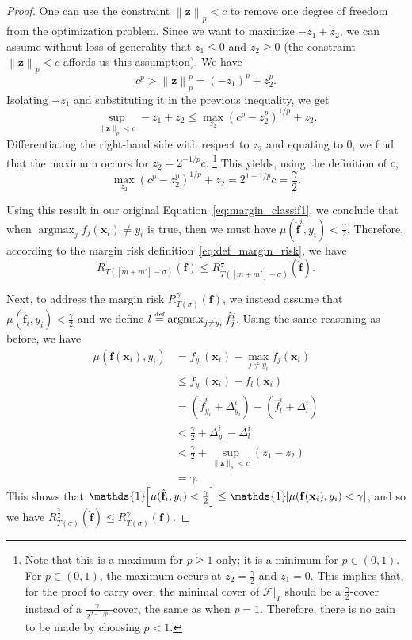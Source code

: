 \documentclass[twoside,11pt]{article}
\newcommand{\Id}[1]{\mathds{1}\hspace{-2.5pt}\left[#1\right]}
\newcommand{\norm}[1]{\left\lVert#1\right\rVert}
\newcommand{\F}{\mathcal{F}}
\newcommand{\f}{\mathbf{f}}
\newcommand{\x}{\mathbf{x}}
\newcommand{\fhat}{\hat{\f}}
\newcommand{\z}{\mathbf{z}}
\newcommand{\gammacover}{\frac{\gamma}{2^{2-1/p}}}
\newcommand{\eqdef}{\overset{\smash{\mbox{\tiny \rm def}}}{=}}
\DeclareMathOperator*{\argmax}{argmax}
\begin{document}
\begin{proof}
One can use the constraint $\norm{\z}_p < c$ to remove one degree of freedom from the optimization problem.
Since we want to maximize $-z_1 + z_2$, we can assume without loss of generality that $z_1 \le 0$ and $z_2 \ge 0$ (the constraint $\norm{\z}_p < c$ affords us this assumption).
We have
\begin{equation*}
    c^p > \norm{\z}_p^p = (-z_1)^p + z_2^p.
\end{equation*}
Isolating $-z_1$ and substituting it in the previous inequality, we get
\begin{equation*}
    \sup_{\lVert\z\rVert_p < c} -z_1 + z_2 \le \max_{z_2} (c^p-z_2^p)^{1/p} + z_2.
\end{equation*}
Differentiating the right-hand side with respect to $z_2$ and equating to $0$, we find that the maximum occurs for $z_2 = 2^{-1/p} c$.
\footnote{Note that this is a maximum for $p \ge 1$ only; it is a minimum for $p \in (0,1)$.
For $p \in (0,1)$, the maximum occurs at $z_2=\frac{\gamma}{2}$ and $z_1=0$.
This implies that, for the proof to carry over, the minimal cover of $\F|_T$ should be a $\frac{\gamma}{2}$-cover instead of a $\gammacover$-cover, the same as when $p=1$.
Therefore, there is no gain to be made by choosing $p<1$.}
This yields, using the definition of $c$,
\begin{equation*}
\max_{z_2} (c^p-z_2^p)^{1/p} + z_2 = 2^{1 - 1/p} c = \frac{\gamma}{2}.
\end{equation*}

Using this result in our original Equation~\eqref{eq:margin_classif1}, we conclude that when $\argmax_j f_j(\x_i) \neq y_i$ is true, then we must have $\mu(\fhat^i,y_i) < \frac{\gamma}{2}$.
Therefore, according to the margin risk definition~\eqref{eq:def_margin_risk}, we have
\begin{equation*}
    R_{T([m+m']-\sigma)}(\f) \le R^{\frac{\gamma}{2}}_{T([m+m']-\sigma)}(\fhat).
\end{equation*}

Next, to address the margin risk $R^\gamma_{T(\sigma)}(\f)$, we instead assume that $\mu(\fhat_i, y_i) < \frac{\gamma}{2}$ and we define $l \eqdef \argmax_{j \ne y_i} \hat{f}_j^i$.
Using the same reasoning as before, we have
\begin{align*}
    \mu(\f(\x_i), y_i)
    &= f_{y_i}(\x_i) - \max_{j\ne y_i} f_j(\x_i)\\
    &\le f_{y_i}(\x_i) - f_l(\x_i)\\
    &= (\hat{f}_{y_i}^i + \Delta_{y_i}^i) - (\hat{f}_{l}^i + \Delta_{l}^i)\\
    &< \frac{\gamma}{2} + \Delta_{y_i}^i - \Delta_{l}^i\\
    &< \frac{\gamma}{2} + \sup_{\lVert \z \rVert_p < c}(z_1-z_2)\\
    &= \gamma. 
\end{align*}
This shows that $\Id{\mu(\fhat_i, y_i) < \frac{\gamma}{2}} \le \Id{\mu(\f(\x_i), y_i) < \gamma}$, and so we have $R^\frac{\gamma}{2}_{T(\sigma)}(\fhat) \le R^\gamma_{T(\sigma)}(\f)$.


\end{proof}
\end{document}
